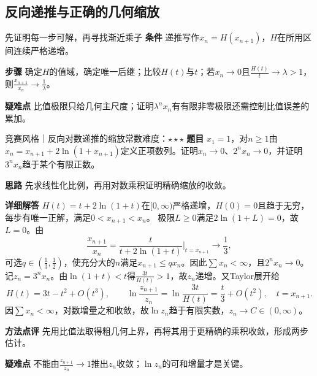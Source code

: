 \subsection{反向递推与正确的几何缩放}\label{cs:inverse}
\begin{method}{先证明每一步可解，再寻找渐近乘子}
\textbf{条件} 递推写作$x_n=H(x_{n+1})$，$H$在所用区间连续严格递增。
\par\textbf{步骤} 确定$H$的值域，确定唯一后继；比较$H(t)$与$t$；若$x_n\to0$且$\frac{H(t)}{t}\to\lambda>1$，则$\frac{x_{n+1}}{x_n}\to\frac{1}{\lambda}$。
\par\textbf{疑难点} 比值极限只给几何主尺度；证明$\lambda^nx_n$有有限非零极限还需控制比值误差的累加。
\end{method}
\begin{example}{竞赛风格｜反向对数递推的缩放常数}{难度：$\star\star\star$}\label{cs:ex:inverselog}
\textbf{题目} $x_1=1$，对$n\ge1$由
$x_n=x_{n+1}+2\ln(1+x_{n+1})$定义正项数列。证明$x_n\to0$、$2^nx_n\to0$，并证明$3^nx_n$趋于某个有限正数。
\par\textbf{思路} 先求线性化比例，再用对数乘积证明精确缩放的收敛。
\par\textbf{详细解答} $H(t)=t+2\ln(1+t)$在$[0,\infty)$严格递增，$H(0)=0$且趋于无穷，每步有唯一正解，满足$0<x_{n+1}<x_n$。
极限$L\ge0$满足$2\ln(1+L)=0$，故$L=0$。由
\[
\dfrac{x_{n+1}}{x_n}
=\dfrac{t}{t+2\ln(1+t)}\bigg|_{t=x_{n+1}}\longrightarrow\dfrac13,
\]
可选$q\in(\frac{1}{3},\frac{1}{2})$，使充分大的$n$满足$x_{n+1}\le qx_n$。因此$\sum x_n<\infty$，且$2^nx_n\to0$。
记$z_n=3^nx_n$。由$\ln(1+t)<t$得$\frac{3t}{H(t)}>1$，故$z_n$递增。又Taylor展开给
\[
H(t)=3t-t^2+O(t^3),\qquad
\ln\dfrac{z_{n+1}}{z_n}=\ln\dfrac{3t}{H(t)}
=\dfrac t3+O(t^2),\quad t=x_{n+1}.
\]
因$\sum x_n<\infty$，对数增量之和收敛，故$\ln z_n$趋于有限实数，$z_n\to C\in(0,\infty)$。
\par\textbf{方法点评} 先用比值法取得粗几何上界，再将其用于更精确的乘积收敛，形成两步估计。
\par\textbf{疑难点} 不能由$\frac{z_{n+1}}{z_n}\to1$推出$z_n$收敛；$\ln z_n$的可和增量才是关键。
\end{example}

